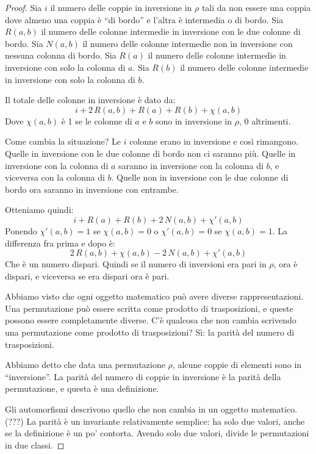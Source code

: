 \begin{proof}
	Sia $i$ il numero delle coppie in inversione in $\rho$ tali da non essere una coppia dove almeno una coppia \`e ``di bordo'' e l'altra \`e intermedia o di bordo.
	Sia $R(a,b)$ il numero delle colonne intermedie in inversione con le due colonne di bordo.
	Sia $N(a,b)$ il numero delle colonne intermedie non in inversione con nessuna colonna di bordo.
	Sia $R(a)$ il numero delle colonne intermedie in inversione con solo la colonna di $a$.
	Sia $R(b)$ il numero delle colonne intermedie in inversione con solo la colonna di $b$.

	Il totale delle colonne in inversione \`e dato da:
	\[
		i + 2 \, R(a,b) + R(a) + R(b) + \chi (a,b)
	\]
	Dove $\chi (a,b)$ \`e 1 se le colonne di $a$ e $b$ sono in inversione in $\rho$, 0 altrimenti.

	Come cambia la situazione?
	Le $i$ colonne erano in inversione e cos\`i rimangono. Quelle in inversione con le due colonne di bordo non ci saranno pi\`u.
	Quelle in inversione con la colonna di $a$ saranno in inversione con la colonna di $b$, e viceversa con la colonna di $b$.
	Quelle non in inversione con le due colonne di bordo ora saranno in inversione con entrambe.

	Otteniamo quindi:
	\[
		i + R(a) + R(b) + 2 \, N(a,b) + \chi'(a,b)
	\]
	Ponendo $\chi'(a,b) = 1$ se $\chi (a,b) = 0$ o $\chi'(a,b) = 0$ se $\chi(a,b) = 1$.
	La differenza fra prima e dopo \`e:
	\[
		2 \, R(a,b) + \chi (a,b) - 2 \, N(a,b) + \chi'(a,b)
	\]
	Che \`e un numero dispari.
	Quindi se il numero di inversioni era pari in $\rho$, ora \`e dispari, e viceversa se era dispari ora \`e pari.

	Abbiamo visto che ogni oggetto matematico pu\`o avere diverse rappresentazioni.
	Una permutazione pu\`o essere scritta come prodotto di trasposizioni, e queste possono essere completamente diverse.
	C'\`e qualcosa che non cambia scrivendo una permutazione come prodotto di trasposizioni?
	S\`i: la parit\`a del numero di trasposizioni.

	Abbiamo detto che data una permutazione $\rho$, alcune coppie di elementi sono in ``inversione''.
	La parit\`a del numero di coppie in inversione \`e la parit\`a della permutazione, e questa \`e una definizione.

	Gli automorfismi descrivono quello che non cambia in un oggetto matematico. (???)
	La parit\`a \`e un invariante relativamente semplice: ha solo due valori, anche se la definizione \`e un po' contorta.
	Avendo solo due valori, divide le permutazioni in due classi.


\end{proof}
